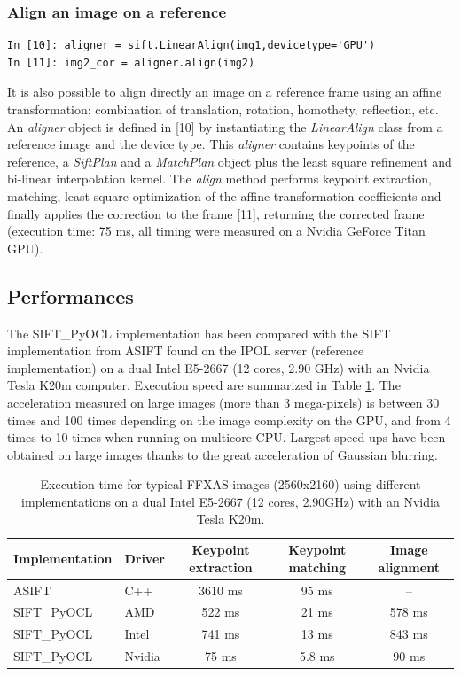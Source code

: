 \documentclass[preprint]{iucr}
\begin{document}
\subsubsection{Align an image on a reference}
\begin{verbatim}
In [10]: aligner = sift.LinearAlign(img1,devicetype='GPU')
In [11]: img2_cor = aligner.align(img2)
\end{verbatim}
It is also possible to align directly an image on a reference frame using an
affine transformation: combination of translation, rotation, homothety,
reflection, etc.
An \emph{aligner} object is defined in [10] by instantiating the
\emph{LinearAlign} class from a reference image and the device type.
This \emph{aligner} contains keypoints of the
reference, a \emph{SiftPlan} and a \emph{MatchPlan} object plus the least square
refinement and bi-linear interpolation kernel.
The \emph{align} method performs keypoint extraction, matching, least-square
optimization of the affine transformation coefficients and finally applies the
correction to the frame [11], returning the corrected frame (execution time:
75 ms, all timing were measured on a Nvidia GeForce Titan GPU).

\subsection{Performances}

The SIFT\_PyOCL implementation has been compared with the SIFT
implementation from ASIFT \cite{ASIFT} found on the IPOL server (reference
implementation) on a dual Intel E5-2667 (12 cores, 2.90 GHz) with an Nvidia
Tesla K20m computer. Execution speed are summarized in Table \ref{bench}.
The acceleration measured on large images (more than 3 mega-pixels) is between
30 times and 100 times depending on the image complexity on the GPU, and from 4
times to 10 times when running on multicore-CPU.
Largest speed-ups have been obtained on large images thanks to the
great acceleration of Gaussian blurring.

\begin{table}
\caption{Execution time for typical FFXAS images (2560x2160) using different
implementations on a dual Intel E5-2667 (12 cores, 2.90GHz) with an Nvidia Tesla
K20m.}
\label{bench}
\vspace{1mm}
\begin{center}
\begin{tabular}{l l ccc}
Implementation & Driver & Keypoint extraction & Keypoint matching &
Image alignment\\
\hline
ASIFT        &   C++     &   3610 ms  & 95 ms  & --  \\
SIFT\_PyOCL  &   AMD  &   522 ms  &  21 ms&  578 ms \\
SIFT\_PyOCL  &   Intel  &   741 ms  &  13 ms&  843 ms\\
SIFT\_PyOCL  &   Nvidia  &    75 ms  &  5.8 ms & 90 ms\\
\end{tabular}
\end{center}
\end{table}
\end{document}

